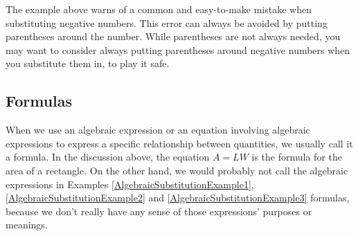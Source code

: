 


\bigskip

The example above warns of a common and easy-to-make mistake when substituting negative numbers. This error can always be avoided by putting parentheses around the number.  While parentheses are not always needed, you may want to consider always putting parentheses around negative numbers when you substitute them in, to play it safe.



%
%

\subsection{Formulas}

When we use an algebraic expression or an equation involving algebraic expressions to express a specific relationship between quantities, we usually call it a formula. In the discussion above, the equation $A=LW$ is the formula for the area of a rectangle. On the other hand, we would probably not call the algebraic expressions in Examples \ref{AlgebraicSubstitutionExample1}, \ref{AlgebraicSubstitutionExample2} and \ref{AlgebraicSubstitutionExample3} formulas, because we don’t really have any sense of those expressions’ purposes or meanings.


